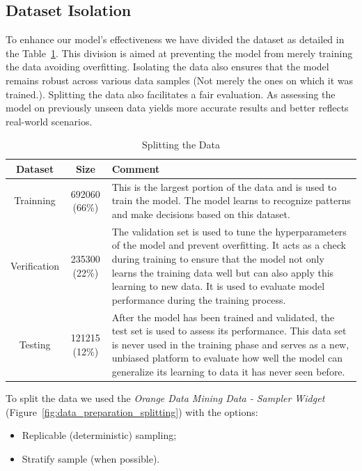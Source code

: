 \subsection{Dataset Isolation}

To enhance our model's effectiveness we have divided the dataset
as detailed in the Table~\ref{tab:dataset_split}. This 
division is aimed at preventing
the model from merely training the data avoiding overfitting. 
Isolating the data also ensures that the model remains robust
across various data samples (Not merely the ones on which it
was trained.). Splitting the data also facilitates a fair 
evaluation. As assessing the model on previously unseen data
yields more accurate results and better reflects real-world
scenarios. 

\begin{table}[H]
    \centering
    \caption{Splitting the Data}
    \label{tab:dataset_split}
    \begin{tabular}{ccp{10cm}} \hline
     \textbf{Dataset} & \textbf{Size} & \textbf{Comment} \\ \hline\hline
      Trainning & 692060 (66\%) & This is the largest portion of
      the data and is used to train
      the model. The model learns to recognize patterns and make decisions based on 
      this dataset. \\
      Verification & 235300 (22\%) & The validation set is used to tune
      the hyperparameters of 
      the model and prevent overfitting. It acts as a check during training to
      ensure that the model not only learns the training data well but can also 
      apply this learning to new data. It is used to evaluate model performance 
      during the training process. \\ 
      Testing & 121215 (12\%) & After the model has been trained and validated, the test
      set is used to assess its performance. This data set is never used in the 
      training phase and serves as a new, unbiased platform to evaluate how well the 
      model can generalize its learning to data it has never seen before. \\ \hline
    \end{tabular}
\end{table}

To split the data we used the 
\emph{Orange Data Mining Data - Sampler Widget} (Figure~\ref{fig:data_preparation_splitting}) with the 
options:
\begin{itemize}
    \item Replicable (deterministic) sampling;
    \item Stratify sample (when possible).
\end{itemize}

